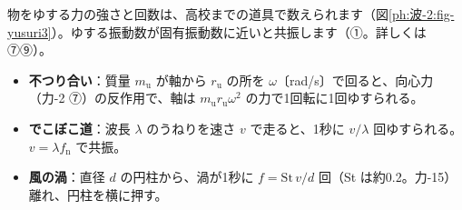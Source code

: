 \label{ph:波-2:kazoeru}物をゆする力の強さと回数は、高校までの道具で数えられます（図\ref{ph:波-2:fig-yusuri3}）。ゆする振動数が固有振動数に近いと共振します（①。詳しくは⑦⑨）。
\begin{itemize}[leftmargin=1.2\zw, itemsep=1pt, topsep=1pt, label={\color{bkTheme}●}]
\item \textbf{不つり合い}：質量 $m_{\mathrm u}$ が軸から $r_{\mathrm u}$ の所を $\omega$〔rad/s〕で回ると、向心力（力-2 ⑦）の反作用で、軸は $m_{\mathrm u}r_{\mathrm u}\omega^2$ の力で1回転に1回ゆすられる。
\item \textbf{でこぼこ道}：波長 $\lambda$ のうねりを速さ $v$ で走ると、1秒に $v/\lambda$ 回ゆすられる。$v=\lambda f_{\mathrm n}$ で共振。
\item \textbf{風の渦}：直径 $d$ の円柱から、渦が1秒に $f=\mathrm{St}\,v/d$ 回（St は約0.2。力-15）離れ、円柱を横に押す。
\end{itemize}
